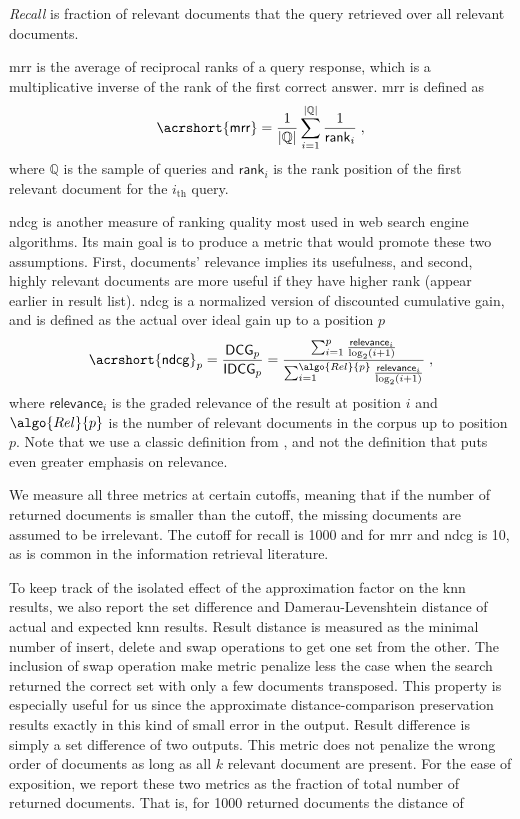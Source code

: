				\emph{Recall} is fraction of relevant documents that the query retrieved over all relevant documents.

				\acrfull{mrr} is the average of reciprocal ranks of a query response, which is a multiplicative inverse of the rank of the first correct answer.
				\acrshort{mrr} is defined as
				\[
					\mathsf{\acrshort{mrr}} = \frac{1}{| \mathbb{Q} |} \sum_{i = 1}^{| \mathbb{Q} |} \frac{1}{\mathsf{rank}_i} \; ,
				\]
				where $\mathbb{Q}$ is the sample of queries and $\mathsf{rank}_i$ is the rank position of the first relevant document for the $i_\text{th}$ query.

				\acrfull{ndcg} is another measure of ranking quality most used in web search engine algorithms.
				Its main goal is to produce a metric that would promote these two assumptions.
				First, documents' relevance implies its usefulness, and second, highly relevant documents are more useful if they have higher rank (appear earlier in result list).
				\acrshort{ndcg} is a normalized version of discounted cumulative gain, and is defined as the actual over ideal gain up to a position $p$
				\[
					\mathsf{\acrshort{ndcg}}_p = \frac{\mathsf{DCG}_p}{\mathsf{IDCG}_p} = \frac{ \sum_{i=1}^p \frac{ \mathsf{relevance}_i }{ \log_2 (i + 1) } }{ \sum_{i=1}^{ \algo{Rel}{p} } \frac{ \mathsf{relevance}_i }{ \log_2 (i + 1) } } \; ,
				\]
				where $\mathsf{relevance}_i$ is the graded relevance of the result at position $i$ and $\algo{Rel}{p}$ is the number of relevant documents in the corpus up to position $p$.
				Note that we use a classic definition from \cite{dcg}, and not the \cite{dcg-updated} definition that puts even greater emphasis on relevance.

				We measure all three metrics at certain cutoffs, meaning that if the number of returned documents is smaller than the cutoff, the missing documents are assumed to be irrelevant.
				The cutoff for recall is \num{1000} and for \acrshort{mrr} and \acrshort{ndcg} is 10, as is common in the information retrieval literature.

				To keep track of the isolated effect of the approximation factor on the \acrshort{knn} results, we also report the set difference and Damerau-Levenshtein distance \cite{levenshtein-distance,damerau-distance} of actual and expected \acrshort{knn} results.
				Result distance is measured as the minimal number of insert, delete and swap operations to get one set from the other.
				The inclusion of swap operation make metric penalize less the case when the search returned the correct set with only a few documents transposed.
				This property is especially useful for us since the approximate distance-comparison preservation results exactly in this kind of small error in the output.
				Result difference is simply a set difference of two outputs.
				This metric does not penalize the wrong order of documents as long as all $k$ relevant document are present.
				For the ease of exposition, we report these two metrics as the fraction of total number of returned documents.
				That is, for \num{1000} returned documents the distance of

